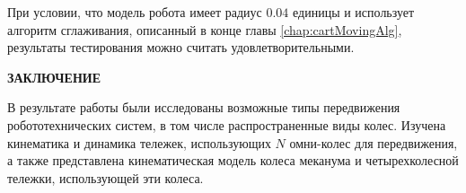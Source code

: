 \documentclass[oneside,final,14pt]{extreport}
\begin{document}
При условии, что модель робота имеет радиус $0.04$ единицы и использует алгоритм сглаживания, описанный в конце главы \ref{chap:cartMovingAlg}, результаты тестирования можно считать удовлетворительными.

\iffalse
\section{Моделирование управляемой голономной тележки}
\subsection{Определение движения тележки посредством плагинов Gazebo}
\section{Реализация управления моделируемой тележки}
\subsection{Управление тележкой посредством джостика}
\subsection{Реализация движения тележки по аналитически заданному пути}
\fi

\newpage
{}
\begin{center}
\bfseries ЗАКЛЮЧЕНИЕ
\end{center}

В результате работы были исследованы возможные типы передвижения робототехнических систем, в том числе распространенные виды колес. Изучена кинематика и динамика тележек, использующих $N$ омни-колес для передвижения, а также представлена кинематическая модель колеса меканума и четырехколесной тележки, использующей эти колеса. 
\end{document}
